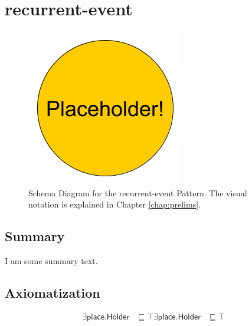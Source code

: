 \section{recurrent-event}
\label{sec:recurrent-event}
\begin{figure}[h!]
\begin{center}
\includegraphics[width=.8\textwidth]{figures/placeholder}
\end{center}
\caption{Schema Diagram for the recurrent-event Pattern. The visual notation is explained in Chapter \ref{chap:prelims}.}
\label{fig:recurrent-event}
\end{figure}
\subsection{Summary}
\label{sum:recurrent-event}
I am some summary text.

\subsection{Axiomatization}
\label{axs:recurrent-event}
\begin{align}
\exists\textsf{place.Holder} &\sqsubseteq \top 
\exists\textsf{place.Holder} &\sqsubseteq \top 
\end{align}

